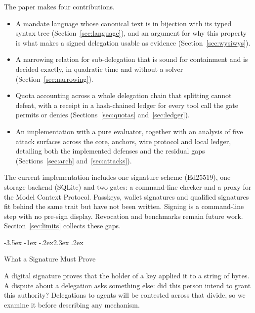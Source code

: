 \documentclass[10pt,twocolumn]{article}
\makeatletter
\theoremstyle{plain}
\theoremstyle{definition}
\renewcommand\section{\@startsection{section}{1}{\z@}%
  {-3.5ex \@plus -1ex \@minus -.2ex}{2.3ex \@plus .2ex}%
  {\normalfont\Large\bfseries\raggedright}}
\makeatother
\begin{document}
The paper makes four contributions.
\begin{itemize}[leftmargin=*,itemsep=1pt,topsep=2pt]
  \item A mandate language whose canonical text is in bijection with its typed syntax tree (Section~\ref{sec:language}), and an argument for why this property is what makes a signed delegation usable as evidence (Section~\ref{sec:wysiwys}).
  \item A narrowing relation for sub-delegation that is sound for containment and is decided exactly, in quadratic time and without a solver (Section~\ref{sec:narrowing}).
  \item Quota accounting across a whole delegation chain that splitting cannot defeat, with a receipt in a hash-chained ledger for every tool call the gate permits or denies (Sections~\ref{sec:quotas} and~\ref{sec:ledger}).
  \item An implementation with a pure evaluator, together with an analysis of five attack surfaces across the core, anchors, wire protocol and local ledger, detailing both the implemented defenses and the residual gaps (Sections~\ref{sec:arch} and~\ref{sec:attacks}).
\end{itemize}

The current implementation includes one signature scheme (Ed25519), one storage backend (SQLite) and two gates: a command-line checker and a proxy for the Model Context Protocol. Passkeys, wallet signatures and qualified signatures fit behind the same trait but have not been written. Signing is a command-line step with no pre-sign display. Revocation and benchmarks remain future work. Section~\ref{sec:limits} collects these gaps.

\section{What a Signature Must Prove}
\label{sec:wysiwys}

A digital signature proves that the holder of a key applied it to a string of bytes. A dispute about a delegation asks something else: did this person intend to grant this authority? Delegations to agents will be contested across that divide, so we examine it before describing any mechanism.
\end{document}

